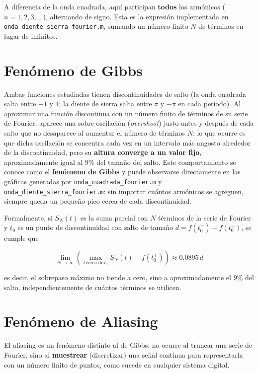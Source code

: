 \documentclass[11pt]{article}
\begin{document}
A diferencia de la onda cuadrada, aquí participan \textbf{todos}
los armónicos ($n = 1, 2, 3, \ldots$), alternando de signo. Esta es
la expresión implementada en
\texttt{onda\_diente\_sierra\_fourier.m}, sumando un número finito
$N$ de términos en lugar de infinitos.

\section{Fenómeno de Gibbs}

Ambas funciones estudiadas tienen discontinuidades de salto (la onda
cuadrada salta entre $-1$ y $1$; la diente de sierra salta entre
$\pi$ y $-\pi$ en cada periodo). Al aproximar una función
discontinua con un número finito de términos de su serie de
Fourier, aparece una sobre-oscilación (\emph{overshoot}) justo
antes y después de cada salto que no desaparece al aumentar el
número de términos $N$: lo que ocurre es que dicha oscilación se
concentra cada vez en un intervalo más angosto alrededor de la
discontinuidad, pero su \textbf{altura converge a un valor fijo},
aproximadamente igual al $9\%$ del tamaño del salto. Este
comportamiento se conoce como el \textbf{fenómeno de Gibbs} y puede
observarse directamente en las gráficas generadas por
\texttt{onda\_cuadrada\_fourier.m} y
\texttt{onda\_diente\_sierra\_fourier.m}: sin importar cuántos
armónicos se agreguen, siempre queda un pequeño pico cerca de cada
discontinuidad.

Formalmente, si $S_N(t)$ es la suma parcial con $N$ términos de la
serie de Fourier y $t_0$ es un punto de discontinuidad con salto de
tamaño $d = f(t_0^+) - f(t_0^-)$, se cumple que

\begin{equation}
\lim_{N \to \infty} \left( \max_{t \,\text{cerca de}\, t_0} S_N(t) - f(t_0^+) \right) \approx 0.0895 \, d
\end{equation}

es decir, el sobrepaso máximo no tiende a cero, sino a
aproximadamente el $9\%$ del salto, independientemente de cuántos
términos se utilicen.

\section{Fenómeno de Aliasing}

El aliasing es un fenómeno distinto al de Gibbs: no ocurre al
truncar una serie de Fourier, sino al \textbf{muestrear} (discretizar)
una señal continua para representarla con un número finito de
puntos, como sucede en cualquier sistema digital.
\end{document}
